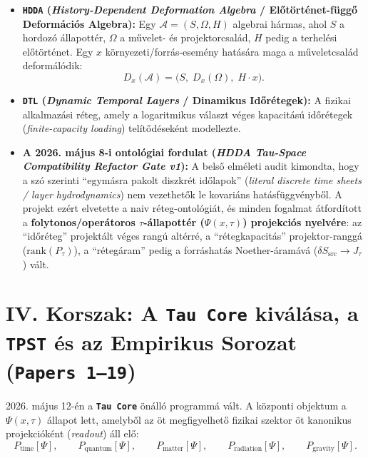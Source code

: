 \documentclass[11pt,a4paper]{article}
\begin{document}
\begin{itemize}[leftmargin=1.5em]
\item \textbf{\texttt{HDDA} (\emph{History-Dependent Deformation Algebra} / El\H{o}történet-függ\H{o} Deformációs Algebra):}
Egy $\mathcal{A} = (S, \Omega, H)$ algebrai hármas, ahol $S$ a hordozó állapottér, $\Omega$ a m\H{u}velet- és projektorcsalád, $H$ pedig a terhelési el\H{o}történet. Egy $x$ környezeti/forrás-esemény hatására maga a m\H{u}veletcsalád deformálódik:
\begin{equation}
D_x(\mathcal{A}) = \big(S,\; D_x(\Omega),\; H\cdot x\big).
\end{equation}
\item \textbf{\texttt{DTL} (\emph{Dynamic Temporal Layers} / Dinamikus Id\H{o}rétegek):}
A fizikai alkalmazási réteg, amely a logaritmikus választ véges kapacitású id\H{o}rétegek (\emph{finite-capacity loading}) telít\H{o}déseként modellezte.
\item \textbf{A 2026. május 8-i ontológiai fordulat (\emph{HDDA Tau-Space Compatibility Refactor Gate v1}):}
A bels\H{o} elméleti audit kimondta, hogy a szó szerinti ``egymásra pakolt diszkrét id\H{o}lapok'' (\emph{literal discrete time sheets / layer hydrodynamics}) nem vezethet\H{o}k le kovariáns hatásfüggvényb\H{o}l. A projekt ezért elvetette a naiv réteg-ontológiát, és minden fogalmat átfordított a \textbf{folytonos/operátoros $\tau$-állapottér ($\Psi(x,\tau)$) projekciós nyelvére}: az ``id\H{o}réteg'' projektált véges rangú altérré, a ``rétegkapacitás'' projektor-ranggá ($\mathrm{rank}(P_\tau)$), a ``rétegáram'' pedig a forráshatás Noether-áramává ($\delta S_{\mathrm{src}} \to J_\tau$) vált.
\end{itemize}

\section{IV. Korszak: A \texttt{Tau Core} kiválása, a \texttt{TPST} és az Empirikus Sorozat (\texttt{Papers 1--19})}

2026. május 12-én a \textbf{\texttt{Tau Core}} önálló programmá vált. A központi objektum a $\Psi(x,\tau)$ állapot lett, amelyb\H{o}l az öt megfigyelhet\H{o} fizikai szektor öt kanonikus projekcióként (\emph{readout}) áll el\H{o}:
\begin{equation}
P_{\mathrm{time}}[\Psi],\qquad P_{\mathrm{quantum}}[\Psi],\qquad P_{\mathrm{matter}}[\Psi],\qquad P_{\mathrm{radiation}}[\Psi],\qquad P_{\mathrm{gravity}}[\Psi].
\end{equation}
\end{document}
